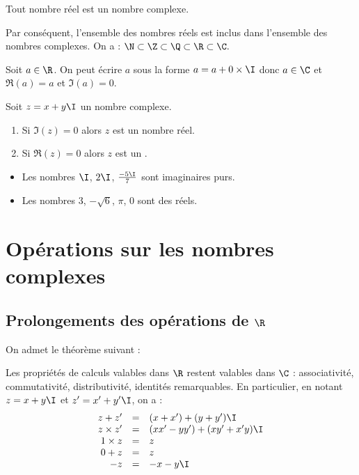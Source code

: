 \documentclass[10pt,openright,twoside,french]{book}
\begin{document}
\begin{Prop}
    Tout nombre réel est un nombre complexe.\par
    Par conséquent, l'ensemble des nombres réels est inclus dans l'ensemble des nombres complexes. On a : $\N \subset \Z \subset \Q \subset \R \subset \C.$
\end{Prop}

\begin{Demo}
    Soit $a \in \R$. On peut écrire $a$ sous la forme $a = a + 0 \times \I$ donc $a \in \C$ et $\Re(a) = a$ et $\Im(a) = 0$.
\end{Demo}

\begin{Defi}
    Soit $z = x + y\I$ un nombre complexe.
    \begin{enumerate}
        \item Si $\Im(z) = 0$ alors $z$ est un nombre réel.
        \item Si $\Re(z) = 0$ alors $z$ est un .
    \end{enumerate}
\end{Defi}

\begin{Exemple}[s]
    \begin{itemize}
        \item Les nombres $\I$, $2\I$, $\frac{-5\I}{7}$ sont imaginaires purs.
        \item Les nombres $3$, $-\sqrt 6$, $\pi$, $0$ sont des réels.
    \end{itemize}
\end{Exemple}

\section{Opérations sur les nombres complexes}
\subsection{Prolongements des opérations de $\R$}

On admet le théorème suivant :

\begin{Thm}
    Les propriétés de calculs valables dans $\R$ restent valables dans $\C$ : associativité, commutativité, distributivité, identités remarquables. En particulier, en notant $z = x+y\I$ et $z' = x' + y'\I$, on a :
    \[\begin{array}{rcl}
        z + z' &=& (x + x') + (y + y')\I \\
        z \times z' &=& (xx' - yy') + (xy' + x'y)\I \\
        1 \times z & = & z \\
        0 + z & = & z \\
        -z &=& -x - y\I
    \end{array}\]
\end{Thm}
\end{document}
